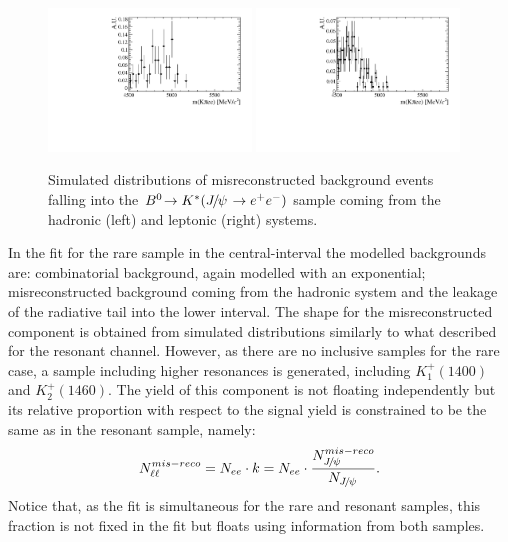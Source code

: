\begin{figure}[h!]
\centering
\includegraphics[width=0.48\textwidth]{RKst/figs/misreco/part_had_jpsi.pdf}
\includegraphics[width=0.48\textwidth]{RKst/figs/misreco/part_lpt_jpsi.pdf}
\caption{Simulated distributions of misreconstructed background events falling into
the $\decay{\Bz}{\Kstar(\jpsi\to\ee)}$ sample coming from the
hadronic (left) and leptonic (right) systems.}
\label{fig:RKst_misreco_distrib}
\end{figure}

In the fit for the rare sample in the central-\qsq interval the modelled
backgrounds are: combinatorial background, again modelled with an exponential; misreconstructed background
coming from the hadronic system and the leakage of the \jpsi radiative tail into the lower \qsq interval.
The shape for the misreconstructed component is obtained from simulated distributions similarly to what described
for the resonant channel. However, as there are no inclusive samples for the rare case,
a sample including higher \Kstar resonances is generated, including $K_1^+(1400)$ and $K_2^+(1460)$.
The yield of this component is not floating independently but its relative proportion
with respect to the signal yield is constrained to be the same as in the resonant sample, namely:
\begin{equation}
N_{\ell\ell}^{mis-reco} = N_{ee} \cdot k = N_{ee} \cdot \frac{N_{\jpsi}^{mis-reco}}{N_{\jpsi}}.
\end{equation}
Notice that, as the fit is simultaneous for the rare and resonant samples, this fraction
is not fixed in the fit but floats using information from both samples.

